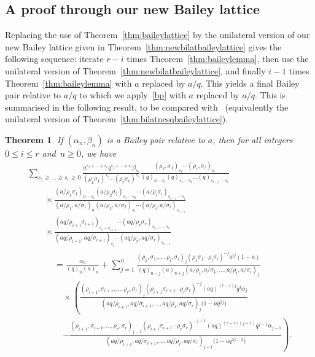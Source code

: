 \documentclass[pdftex]{sigma}
\numberwithin{equation}{section}
\newtheorem{Theorem}{Theorem}[section]
\begin{document}
\subsection{A proof through our new Bailey lattice}

Replacing the use of Theorem~\ref{thm:baileylattice} by the unilateral version of our new Bailey lattice given in Theorem~\ref{thm:newbilatbaileylattice} gives the following sequence: iterate $r-i$ times Theorem~\ref{thm:baileylemma}, then use the unilateral version of Theorem~\ref{thm:newbilatbaileylattice}, and finally $i-1$ times Theorem~\ref{thm:baileylemma} with $a$ replaced by $a/q$. This yields a final Bailey pair relative to $a/q$ to which we apply~\eqref{bp} with $a$ replaced by $a/q$. This is summarised in the following result, to be compared with~\cite[Theorem 3.1]{AAB} (equivalently the unilateral version of Theorem~\ref{thm:bilatncsqbaileylattice}).

\begin{Theorem}\label{thm:ncsqnewbaileylattice}
If $(\alpha_n, \beta_n)$ is a Bailey pair relative to $a$, then for all integers $0\leq i\leq r$ and~${n\geq0}$, we have
\begin{gather}
\sum_{s_1\geq\dots\geq s_{r}\geq0}\frac{a^{s_1+\dots+s_r}q^{s_i+\dots+s_{r}}\beta_{s_r}}{(\rho_1\sigma_1)^{s_1}
\cdots(\rho_r\sigma_r)^{s_r}}\frac{(\rho_1,\sigma_1)_{s_1}\cdots(\rho_r,\sigma_r)_{s_r}}{(q)_{n-s_1}(q)_{s_1-s_2}\dots(q)_{s_{r-1}-s_r}}\nonumber\\
\qquad{}\times\frac{(a/\rho_1\sigma_1)_{n-s_1}(a/\rho_2\sigma_2)_{s_1-s_2}\cdots(a/\rho_i\sigma_i)_{s_{i-1}-s_i}}{(a/\rho_1,a/\sigma_1)_{n}(a/\rho_2,a/\sigma_2)_{s_1}
\cdots(a/\rho_i,a/\sigma_i)_{s_{i-1}}}\nonumber\\
\qquad{}\times
\frac{(aq/\rho_{i+1}\sigma_{i+1})_{s_i-s_{i+1}}\cdots(aq/\rho_r\sigma_r)_{s_{r-1}-s_r}}{(aq/\rho_{i+1},aq/\sigma_{i+1})_{s_i}
\cdots(aq/\rho_r,aq/\sigma_r)_{s_{r-1}}}\nonumber\\
\phantom{\qquad{}\times}{}=\frac{\alpha_0}{(q)_n(a)_n}+\sum_{j=1}^{n}
\frac{(\rho_1,\sigma_1,\dots,\rho_i,\sigma_i)_j(\rho_1\sigma_1\cdots\rho_i\sigma_i)^{-j}a^{ij}(1-a)}{(q)_{n-j}(a)_{n+j} (a/\rho_1,a/\sigma_1,\dots,a/\rho_i,a/\sigma_i)_j}\nonumber\\
\phantom{\qquad{}\times=}{}\times\left(\frac{(\rho_{i+1},\sigma_{i+1},\dots,\rho_r,\sigma_r)_j(\rho_{i+1}\sigma_{i+1}
\cdots\rho_r\sigma_r)^{-j}(aq)^{(r-i)j}q^j\alpha_j}{(aq/\rho_{i+1},aq/\sigma_{i+1},\dots,aq/\rho_r,aq/\sigma_r)_j\bigl(1-aq^{2j}\bigr)}\right.\nonumber\\
\phantom{\qquad{}\times=}{}\left.- \frac{(\rho_{i+1},\sigma_{i+1},\dots,\rho_r,\sigma_r)_{j-1}(\rho_{i+1}\sigma_{i+1}\cdots\rho_r\sigma_r)^{-j+1} (aq)^{(r-i)(j-1)}q^{j-1}\alpha_{j-1}}{(aq/\rho_{i+1},aq/\sigma_{i+1},
\dots,aq/\rho_r,aq/\sigma_r)_{j-1}\bigl(1-aq^{2j-2}\bigr)}\right).\!\!\!\label{ncsqnewlattice}
\end{gather}
\end{Theorem}
\end{document}
